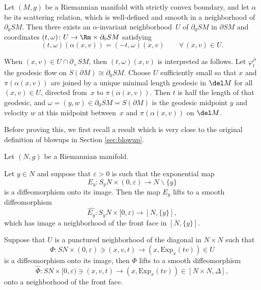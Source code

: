 \begin{Lemma}\label{lem:scatcoords}
Let $(M,g)$ be a Riemannian manifold with strictly convex boundary, and let $\alpha$ be its scattering relation, which is well-defined and smooth in
a neighborhood of $\partial_0 SM$. Then there exists an $\alpha$-invariant neighborhood~$U$ of $\partial_0 SM$ in $\partial SM$ and coordinates $(t,\omega)\colon U\to \Rm\times \partial_0 SM$ satisfying\vspace*{-3pt}\enlargethispage{.5\baselineskip}
\begin{equation*}
(t,\omega) (\alpha(x,v)) = (-t,\omega)(x,v) \qquad \forall\, (x,v)\in U.
\end{equation*}
\end{Lemma}

When $(x,v)\in U\cap \partial_+ SM$, then $(t,\omega)(x,v)$ is interpreted as follows. Let $\varphi_t^\partial$ the geodesic
flow on $S(\partial M) \cong \partial_0 SM$. Choose $U$ sufficiently small so that $x$ and $\pi(\alpha(x,v))$ are joined
by a unique minimal length geodesic in $\del M$ for all $(x,v) \in U$, directed from~$x$ to $\pi(\alpha(x,v))$. Then $t$ is half the length of that geodesic, and $\omega = (y,w)\in \partial_0 SM = S(\partial M)$ is the geodesic midpoint $y$ and velocity $w$ at this midpoint between~$x$ and $\pi(\alpha(x,v))$ on $\del M$.

Before proving this, we first recall a result which is very close to the original definition of blowups in Section \ref{sec:blowup}.
\begin{Lemma}\label{lem:lift}
Let $(N,g)$ be a Riemannian manifold.
\begin{enumeratei}
\item\label{lem:lifti}
Let $y\in N$ and suppose that $\varepsilon>0$ is such that the exponential map\vspace*{-3pt}
\[
E_y \colon S_y N \times (0,\varepsilon) \to N\backslash\{y\}
\]
is a diffeomorphism onto its image. Then the map $E_y$ lifts to a smooth diffeomorphism\vspace*{-3pt}
\begin{equation*}
\widehat{E_y}\colon S_y N\times [0,\varepsilon) \to [N,\{y\}],
\end{equation*}
which has image a neighborhood of the front face in $[N, \{y\}]$.

\item\label{lem:liftii}
Suppose that $U$ is a punctured neighborhood of the diagonal in $N\times N$ such that\vspace*{-3pt}
\begin{equation*}
\Phi\colon SN\times (0,\varepsilon) \ni (x,v,t) \to (x,\mathrm{Exp}_{x}(tv)) \in U
\end{equation*}
is a diffeomorphism onto its image, then $\Phi$ lifts to a smooth diffeomorphism
\begin{equation*}
\widehat{\Phi}\colon SN\times [0,\varepsilon) \ni (x,v,t) \to (x,\mathrm{Exp}_{x}(tv)) \in [N\times N,\Delta],
\end{equation*}
onto a neighborhood of the front face.
\end{enumeratei}
\end{Lemma}

